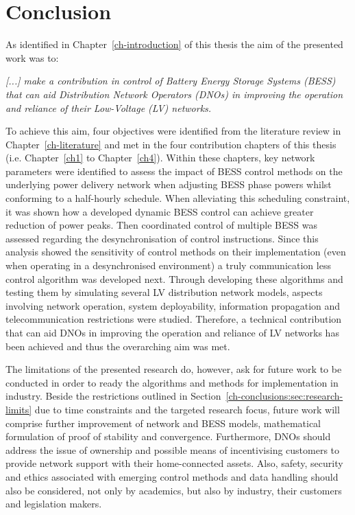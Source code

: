 \section{Conclusion}
\label{ch-conclusions:sec:conclusion}

As identified in Chapter~\ref{ch-introduction} of this thesis the aim of the presented work was to:

\textit{[...] make a contribution in control of Battery Energy Storage Systems (BESS) that can aid Distribution Network Operators (DNOs) in improving the operation and reliance of their Low-Voltage (LV) networks.}

To achieve this aim, four objectives were identified from the literature review in Chapter~\ref{ch-literature} and met in the four contribution chapters of this thesis (i.e. Chapter~\ref{ch1} to Chapter~\ref{ch4}).
Within these chapters, key network parameters were identified to assess the impact of BESS control methods on the underlying power delivery network when adjusting BESS phase powers whilst conforming to a half-hourly schedule.
When alleviating this scheduling constraint, it was shown how a developed dynamic BESS control can achieve greater reduction of power peaks.
Then coordinated control of multiple BESS was assessed regarding the desynchronisation of control instructions.
Since this analysis showed the sensitivity of control methods on their implementation (even when operating in a desynchronised environment) a truly communication less control algorithm was developed next.
Through developing these algorithms and testing them by simulating several LV distribution network models, aspects involving network operation, system deployability, information propagation and telecommunication restrictions were studied.
Therefore, a technical contribution that can aid DNOs in improving the operation and reliance of LV networks has been achieved and thus the overarching aim was met.

The limitations of the presented research do, however, ask for future work to be conducted in order to ready the algorithms and methods for implementation in industry.
Beside the restrictions outlined in Section~\ref{ch-conclusions:sec:research-limits} due to time constraints and the targeted research focus, future work will comprise further improvement of network and BESS models, mathematical formulation of proof of stability and convergence.
Furthermore, DNOs should address the issue of ownership and possible means of incentivising customers to provide network support with their home-connected assets.
Also, safety, security and ethics associated with emerging control methods and data handling should also be considered, not only by academics, but also by industry, their customers and legislation makers.

